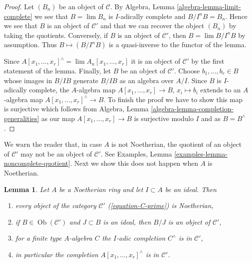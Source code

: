 \documentclass{stacks-project}
\newenvironment{reference}{\comment}{\endcomment}
\theoremstyle{plain}
\newtheorem{lemma}[subsection]{Lemma}
\theoremstyle{definition}
\theoremstyle{remark}
\numberwithin{equation}{subsection}
\def\lim{\mathop{\mathrm{lim}}\nolimits}
\def\Ob{\mathop{\mathrm{Ob}}\nolimits}
\begin{document}
\begin{proof}
Let $(B_n)$ be an object of $\mathcal{C}$. By
Algebra, Lemma \ref{algebra-lemma-limit-complete}
we see that $B = \lim B_n$ is $I$-adically complete
and $B/I^nB = B_n$. Hence we see that $B$ is an object of
$\mathcal{C}'$ and that we can recover the object $(B_n)$ 
by taking the quotients.
Conversely, if $B$ is an object of $\mathcal{C}'$, then
$B = \lim B/I^nB$ by assumption. Thus $B \mapsto (B/I^nB)$ is a quasi-inverse
to the functor of the lemma.

\medskip\noindent
Since $A[x_1, \ldots, x_r]^\wedge = \lim A_n[x_1, \ldots, x_r]$
it is an object of $\mathcal{C}'$ by the first statement of the lemma.
Finally, let $B$ be an object of $\mathcal{C}'$. Choose
$b_1, \ldots, b_r \in B$ whose images in $B/IB$ generate
$B/IB$ as an algebra over $A/I$. Since $B$ is $I$-adically
complete, the $A$-algebra map $A[x_1, \ldots, x_r] \to B$, $x_i \mapsto b_i$
extends to an $A$-algebra map $A[x_1, \ldots, x_r]^\wedge \to B$.
To finish the proof we have to show this map is surjective
which follows from Algebra, Lemma \ref{algebra-lemma-completion-generalities}
as our map $A[x_1, \ldots, x_r] \to B$ is surjective modulo $I$
and as $B = B^\wedge$.
\end{proof}

\noindent
We warn the reader that, in case $A$ is not Noetherian, the
quotient of an object of $\mathcal{C}'$ may not be an object
of $\mathcal{C}'$. See Examples, Lemma
\ref{examples-lemma-noncomplete-quotient}.
Next we show this does not happen when $A$ is Noetherian.

\begin{lemma}
\label{lemma-topologically-finite-type-Noetherian}
\begin{reference}
\cite[Proposition 7.5.5]{EGA1}
\end{reference}
Let $A$ be a Noetherian ring and let $I \subset A$ be an ideal. Then
\begin{enumerate}
\item every object of the category $\mathcal{C}'$
(\ref{equation-C-prime}) is Noetherian,
\item if $B \in \Ob(\mathcal{C}')$ and $J \subset B$ is an ideal,
then $B/J$ is an object of $\mathcal{C}'$,
\item for a finite type $A$-algebra $C$ the $I$-adic completion
$C^\wedge$ is in $\mathcal{C}'$,
\item in particular the completion $A[x_1, \ldots, x_r]^\wedge$
is in $\mathcal{C}'$.
\end{enumerate}
\end{lemma}
\end{document}
